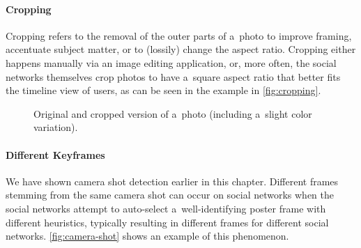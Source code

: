 \paragraph{Cropping}

Cropping refers to the removal of the outer parts of a~photo
to improve framing, accentuate subject matter,
or to (lossily) change the aspect ratio.
Cropping either happens manually via an image editing application,
or, more often, the social networks themselves crop photos
to have a~square aspect ratio
that better fits the timeline view of users,
as can be seen in the example in \autoref{fig:cropping}.

\begin{figure}[h!]
  \centering
  \caption[Original and cropped version of a~photo]
  {Original and cropped version of a~photo (including a~slight color variation).}
  \label{fig:cropping}  
\end{figure}

\paragraph{Different Keyframes}

We have shown camera shot detection earlier in this chapter.
Different frames stemming from the same camera shot
can occur on social networks when the social networks attempt to auto-select
a~well-identifying poster frame with different heuristics,
typically resulting in different frames for different social networks.
\autoref{fig:camera-shot} shows an example of this phenomenon.

